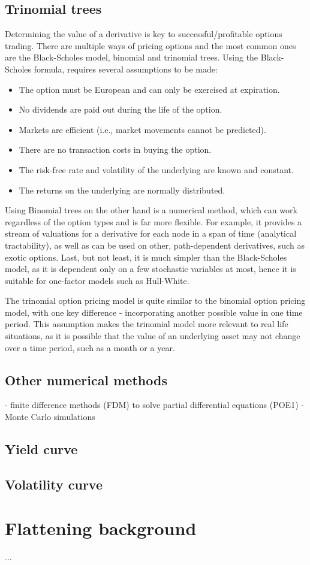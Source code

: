 \subsection{Trinomial trees}
Determining the value of a derivative is key to successful/profitable options trading. There are multiple ways of pricing options and the most common ones are the Black-Scholes model\cite{blackscholes}, binomial and trinomial trees. Using the Black-Scholes formula, requires several assumptions to be made:
\begin{itemize}
    \item The option must be European and can only be exercised at expiration.
    \item No dividends are paid out during the life of the option.
    \item Markets are efficient (i.e., market movements cannot be predicted).
    \item There are no transaction costs in buying the option.
    \item The risk-free rate and volatility of the underlying are known and constant.
    \item The returns on the underlying are normally distributed.
\end{itemize}
Using Binomial trees on the other hand is a numerical method, which can work regardless of the option types and is far more flexible. For example, it provides a stream of valuations for a derivative for each node in a span of time (analytical tractability), as well as can be used on other,  path-dependent derivatives, such as exotic options. Last, but not least, it is much simpler than the Black-Scholes model, as it is dependent only on a few stochastic variables at most, hence it is suitable for one-factor models such as Hull-White. 

The trinomial option pricing model is quite similar to the binomial option pricing model, with one key difference - incorporating another possible value in one time period. This assumption makes the trinomial model more relevant to real life situations, as it is possible that the value of an underlying asset may not change over a time period, such as a month or a year.

\subsection{Other numerical methods}
- finite difference methods (FDM) to solve partial differential equations (POE1)
- Monte Carlo simulations
\subsection{Yield curve}
\subsection{Volatility curve}

\section{Flattening background}
...